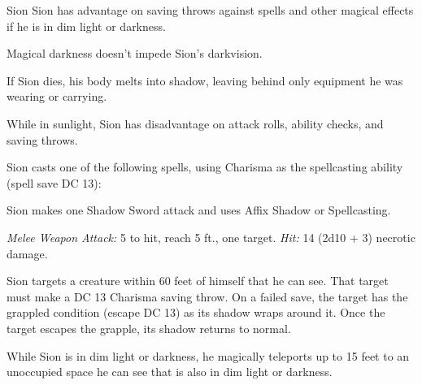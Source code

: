 \documentclass[10pt,a4paper,twoside,bg=print,twocolumn,openany,nodeprecatedcode]{dndbook}
\begin{document}
\begin{DndMonster}[float=t]{Sion}
\DndMonsterBasics[
armor-class = {12},
hit-points = {\DndDice{9d8 + 9}},
speed = {30 ft.}
]
\DndMonsterAbilityScores[
 str = 16,
 dex = 14,
 con = 13,
 int = 12,
 wis = 14,
 cha = 16
]
\DndMonsterDetails[
saving-throws = {Con +3, Cha +5},
skills = {Arcana +3, Perception +4, Stealth +6},
senses = {darkvision 120 ft., passive perception 14},
languages = {Common},
challenge = 2,
]
Sion has advantage on saving throws against spells and other magical effects if he is in dim light or darkness.

Magical darkness doesn't impede Sion's darkvision.

If Sion dies, his body melts into shadow, leaving behind only equipment he was wearing or carrying.

While in sunlight, Sion has disadvantage on attack rolls, ability checks, and saving throws.

Sion casts one of the following spells, using Charisma as the spellcasting ability (spell save DC 13):
\begin{DndMonsterSpells}
\end{DndMonsterSpells}
Sion makes one Shadow Sword attack and uses Affix Shadow or Spellcasting.

\textsl{Melee Weapon Attack:} 5 to hit, reach 5 ft., one target. \textsl{Hit:} 14 (2d10 + 3) necrotic damage.

Sion targets a creature within 60 feet of himself that he can see. That target must make a DC 13 Charisma saving throw. On a failed save, the target has the grappled condition (escape DC 13) as its shadow wraps around it. Once the target escapes the grapple, its shadow returns to normal.

While Sion is in dim light or darkness, he magically teleports up to 15 feet to an unoccupied space he can see that is also in dim light or darkness.

\end{DndMonster}
\end{document}
